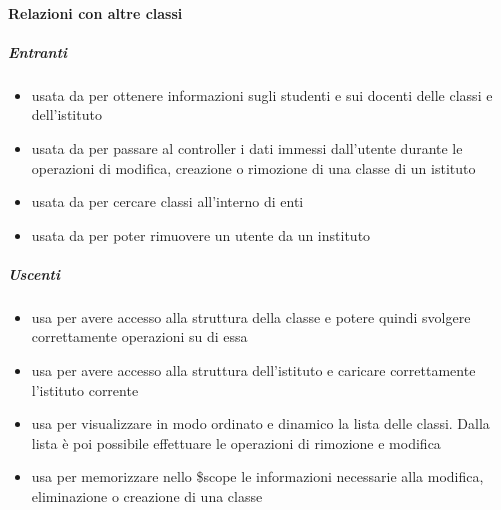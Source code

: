 \paragraph{Relazioni con altre classi}
\subparagraph{Entranti}
\begin{itemize}
\item usata da  per ottenere informazioni sugli studenti e sui docenti delle classi e dell'istituto
\item usata da  per passare al controller i dati immessi dall'utente durante le operazioni di modifica, creazione o rimozione di una classe di un istituto
\item usata da  per cercare classi all'interno di enti
\item usata da  per poter rimuovere un utente da un instituto
\end{itemize}
\subparagraph{Uscenti}
\begin{itemize}
\item usa  per avere
accesso alla struttura della classe e potere quindi svolgere correttamente operazioni su di
essa
\item usa  per avere accesso alla struttura dell'istituto e caricare correttamente l'istituto corrente
\item usa  per visualizzare in modo ordinato e dinamico la lista delle classi. Dalla lista è poi possibile effettuare le operazioni di rimozione e modifica
\item usa  per memorizzare nello \$scope le informazioni necessarie alla modifica, eliminazione o creazione di una classe
\end{itemize}
